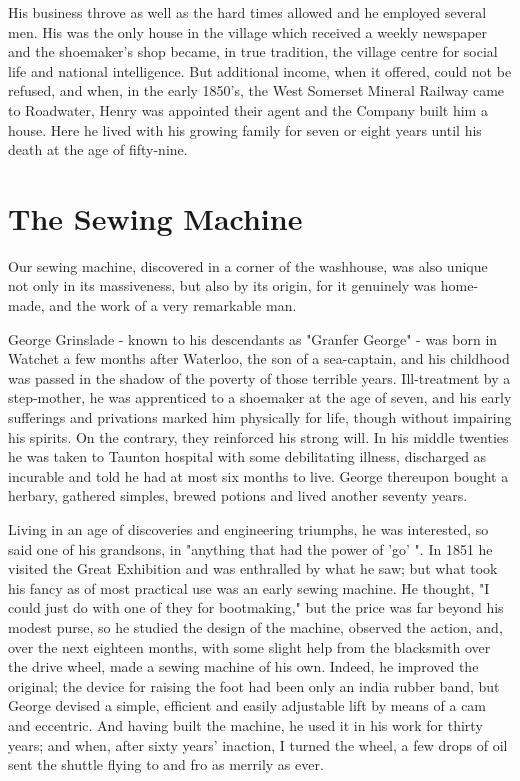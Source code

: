 His business throve as well as the hard times allowed and he employed several men. His was the only house in the village	which received	a weekly newspaper and the shoemaker's shop became, in true tradition, the village centre for social life and national intelligence. But additional income, when it offered, could not be refused, and when, in the early 1850's, the West Somerset Mineral Railway came to Roadwater, Henry was appointed their agent and the Company built him a house. Here he lived with his growing family for seven or eight years until his death at the age of fifty-nine.
 
\section{The Sewing Machine}  
 
Our sewing machine, discovered in a corner of	the washhouse,	was also unique not only in its massiveness, but	also by its	origin, for it	genuinely was home-made, and the work of a very remarkable man.

George Grinslade - known to his descendants as "Granfer George" - was born in Watchet a few months after Waterloo, the son of a sea-captain, and his childhood was passed in the shadow of the poverty of those terrible years. Ill-treatment by a step-mother, he was apprenticed to a shoemaker at the age of seven, and his early sufferings and privations marked him physically for life, though without impairing his spirits. On the contrary, they reinforced his strong will. In his middle twenties he was taken to Taunton hospital with some debilitating illness, discharged as incurable and told he had at most six months to live. George thereupon bought a herbary, gathered simples, brewed potions and lived another seventy years.

Living in an age of discoveries and engineering triumphs, he was interested, so said one of his grandsons, in "anything that had the power of 'go' ". In 1851 he visited the Great Exhibition and was enthralled by what he saw; but what took his fancy as of most practical use was an early sewing machine. He thought, "I could just do with one of they for bootmaking," but the price was far beyond his modest purse, so he studied the design of the machine, observed the action, and, over the next eighteen months, with some slight help from the blacksmith over the drive wheel, made a sewing machine of his own. Indeed, he improved the original; the device for raising the foot had been only an india rubber band, but George devised a simple, efficient and easily adjustable lift by means of a cam and eccentric. And having built the machine, he used it in his work for thirty years; and when, after sixty years’ inaction, I turned the wheel, a few drops of oil sent the shuttle flying to and fro as merrily as ever.

